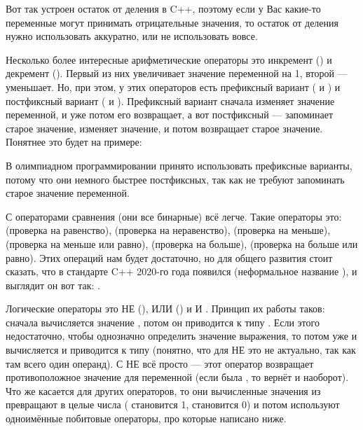 \begin{itemize}
{    Вот так устроен остаток от деления в C++, поэтому если у Вас какие-то переменные могут принимать отрицательные значения, то остаток от деления нужно использовать аккуратно, или не использовать вовсе.
    
    \item Несколько более интересные арифметические операторы это инкремент (\lcpp{++}) и декремент (\lcpp{--}). Первый из них увеличивает значение переменной на 1, второй — уменьшает. Но, при этом, у этих операторов есть префиксный вариант ( и ) и постфиксный вариант ( и ). Префиксный вариант сначала изменяет значение переменной, и уже потом его возвращает, а вот постфиксный — запоминает старое значение, изменяет значение, и потом возвращает старое значение. Понятнее это будет на примере:
    
    
    В олимпиадном программировании принято использовать префиксные варианты, потому что они немного быстрее постфиксных, так как не требуют запоминать старое значение переменной.
    
    \item С операторами сравнения (они все бинарные) всё легче. Такие операторы это:  (проверка на равенство),  (проверка на неравенство),  (проверка на меньше),  (проверка на меньше или равно),  (проверка на больше),  (проверка на больше или равно). Этих операций нам будет достаточно, но для общего развития стоит сказать, что в стандарте C++ 2020-го года появился  (неформальное название ), и выглядит он вот так: .
    
    \item Логические операторы это НЕ (), ИЛИ () и И . Принцип их работы таков: сначала вычисляется значение , потом он приводится к типу . Если этого недостаточно, чтобы однозначно определить значение выражения, то потом уже и  вычисляется и приводится к типу  (понятно, что для НЕ это не актуально, так как там всего один операнд). С НЕ всё просто — этот оператор возвращает противоположное значение для переменной (если была , то вернёт  и наоборот). Что же касается для других операторов, то они вычисленные значения из  превращают в целые числа ( становится 1,  становится 0) и потом используют одноимённые побитовые операторы, про которые написано ниже.
    
}
\end{itemize}
